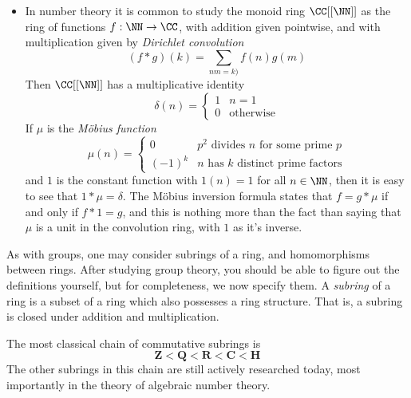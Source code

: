 \begin{itemize}
    \item In number theory it is common to study the monoid ring $\CC[[\NN]]$ as the ring of functions $f: \NN \to \CC$, with addition given pointwise, and with multiplication given by \emph{Dirichlet convolution}
    \[ (f * g)(k) = \sum_{nm = k)} f(n) g(m) \]
    Then $\CC[[\NN]]$ has a multiplicative identity
    \[ \delta(n) = \begin{cases} 1 & n = 1 \\ 0 & \text{otherwise} \end{cases} \]
    If $\mu$ is the {\it M\"{o}bius function}
    \[ \mu(n) = \begin{cases} 0 & \text{$p^2$ divides $n$ for some prime $p$} \\ (-1)^k & \text{$n$ has $k$ distinct prime factors} \end{cases} \]
    and $1$ is the constant function with $1(n) = 1$ for all $n \in \NN$, then it is easy to see that $1 * \mu = \delta$. The M\"{o}bius inversion formula states that $f = g * \mu$ if and only if $f * 1 = g$, and this is nothing more than the fact than saying that $\mu$ is a unit in the convolution ring, with $1$ as it's inverse.
\end{itemize}
%
As with groups, one may consider subrings of a ring, and homomorphisms between rings. After studying group theory, you should be able to figure out the definitions yourself, but for completeness, we now specify them. A \emph{subring} of a ring is a subset of a ring which also possesses a ring structure. That is, a subring is closed under addition and multiplication.

\begin{example}
    The most classical chain of commutative subrings is
    \[ \mathbf{Z} < \mathbf{Q} < \mathbf{R} < \mathbf{C} < \mathbf{H} \]
    The other subrings in this chain are still actively researched today, most importantly in the theory of algebraic number theory.
\end{example}

